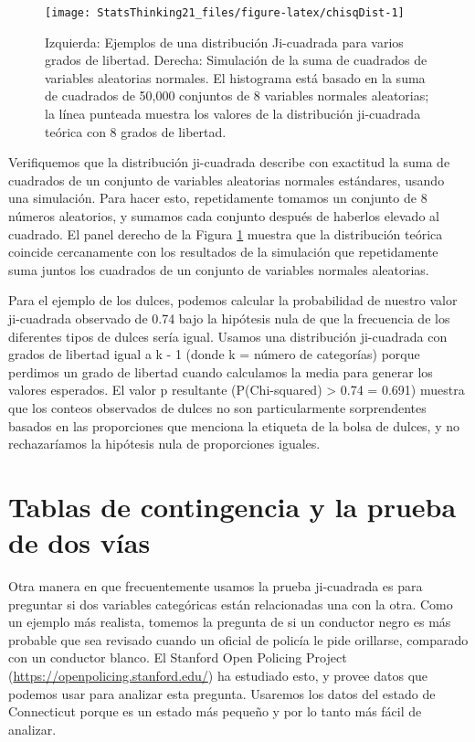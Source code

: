 \documentclass[
  12pt,
]{book}
\begin{document}
\begin{figure}
\texttt{[image: StatsThinking21\_files/figure-latex/chisqDist-1]} \caption{Izquierda: Ejemplos de una distribución Ji-cuadrada para varios grados de libertad. Derecha: Simulación de la suma de cuadrados de variables aleatorias normales. El histograma está basado en la suma de cuadrados de 50,000 conjuntos de 8 variables normales aleatorias; la línea punteada muestra los valores de la distribución ji-cuadrada teórica con 8 grados de libertad.}\label{fig:chisqDist}
\end{figure}

Verifiquemos que la distribución ji-cuadrada describe con exactitud la suma de cuadrados de un conjunto de variables aleatorias normales estándares, usando una simulación. Para hacer esto, repetidamente tomamos un conjunto de 8 números aleatorios, y sumamos cada conjunto después de haberlos elevado al cuadrado. El panel derecho de la Figura \ref{fig:chisqDist} muestra que la distribución teórica coincide cercanamente con los resultados de la simulación que repetidamente suma juntos los cuadrados de un conjunto de variables normales aleatorias.

Para el ejemplo de los dulces, podemos calcular la probabilidad de nuestro valor ji-cuadrada observado de 0.74 bajo la hipótesis nula de que la frecuencia de los diferentes tipos de dulces sería igual. Usamos una distribución ji-cuadrada con grados de libertad igual a k - 1 (donde k = número de categorías) porque perdimos un grado de libertad cuando calculamos la media para generar los valores esperados. El valor p resultante (P(Chi-squared) \textgreater{} 0.74 = 0.691) muestra que los conteos observados de dulces no son particularmente sorprendentes basados en las proporciones que menciona la etiqueta de la bolsa de dulces, y no rechazaríamos la hipótesis nula de proporciones iguales.

\hypertarget{two-way-test}{%
\section{Tablas de contingencia y la prueba de dos vías}\label{two-way-test}}

Otra manera en que frecuentemente usamos la prueba ji-cuadrada es para preguntar si dos variables categóricas están relacionadas una con la otra. Como un ejemplo más realista, tomemos la pregunta de si un conductor negro es más probable que sea revisado cuando un oficial de policía le pide orillarse, comparado con un conductor blanco. El Stanford Open Policing Project (\url{https://openpolicing.stanford.edu/}) ha estudiado esto, y provee datos que podemos usar para analizar esta pregunta. Usaremos los datos del estado de Connecticut porque es un estado más pequeño y por lo tanto más fácil de analizar.
\end{document}
